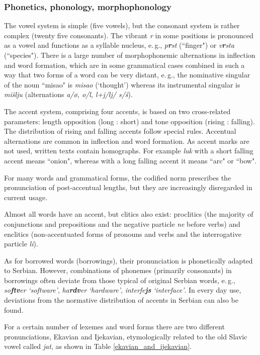 \begin{multicols}{2}
\subsubsection {Phonetics, phonology, morphophonology}

The vowel system is simple (five vowels), but the consonant system is rather complex (twenty five consonants). The vibrant \textit{r} in some positions is pronounced as a vowel and functions as a syllable nucleus, e.\,g., \textit{p\textbf{r}st} (``finger") or \textit{v\textbf{r}sta} (``species"). There is a large number of morphophonemic alternations in inflection and word formation, which are in some grammatical cases combined in such a way that two forms of a word can be very distant, e.\,g., the nominative singular of the noun ``misao" is \textit{misao} (‘thought’) whereas its instrumental singular is \textit{mišlju} (alternations \textit{a/\o{}, o/l, l+j/lj/ s/š}).

The accent system, comprising four accents, is based on two cross-related parameters: length opposition (long : short) and tone opposition (rising : falling). The distribution of rising and falling accents follow special rules. Accentual alternations are common in inflection and word formation. As accent marks are not used, written texts contain homographs. For example \textit{luk} with a short falling accent means ``onion", whereas with a long falling accent it means ``arc" or ``bow". 

For many words and grammatical forms, the codified norm prescribes the pronunciation of post-accentual lengths, but they are increasingly disregarded in current usage.

Almost all words have an accent, but clitics also exist: proclitics (the majority of conjunctions and prepositions and the negative particle \textit{ne} before verbs) and enclitics (non-accentuated forms of pronouns and verbs and the interrogative particle \textit{li}). 

As for borrowed words (borrowings), their pronunciation is phonetically adapted to Serbian. However, combinations of phonemes (primarily consonants) in borrowings often deviate from those typical of original Serbian words, e.\,g., \textit{so\textbf{ftv}er} \textit{‘software’}, \textit{ha\textbf{rdv}er} \textit{‘hardware’}, \textit{interfe\textbf{js}} \textit{‘interface’}. In every day use, deviations from the normative distribution of accents in Serbian can also be found. 

For a certain number of lexemes and word forms there are two different pronunciations, Ekavian and Ijekavian, etymologically related to the old Slavic vowel called \textit{jat}, as shown in Table \ref{ekavian_and_ijekavian}. 


\end{multicols}
